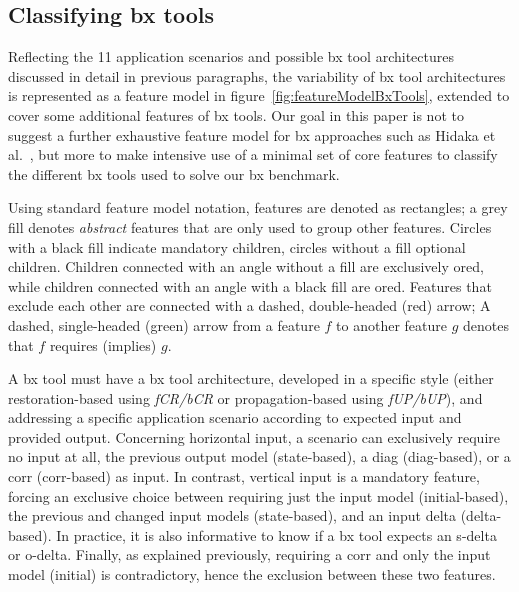 \subsection{Classifying bx tools}
\label{sec:classifying-bx-tools}
Reflecting the 11 application scenarios and possible bx tool architectures discussed in detail in previous paragraphs, the variability of bx tool architectures is represented as a feature model in figure~\ref{fig:featureModelBxTools}, extended to cover some additional features of bx tools.
Our goal in this paper is not to suggest a further exhaustive feature model for bx approaches such as Hidaka et al.~\cite{SOSYM-Hidaka2016}, but more to make intensive use of a minimal set of core features to classify the different bx tools used to solve our bx benchmark.

Using standard feature model notation, features are denoted as rectangles; a grey fill denotes \emph{abstract} features that are only used to group other features.
Circles with a black fill indicate mandatory children, circles without a fill optional children.
Children connected with an angle without a fill are exclusively ored, while children connected with an angle with a black fill are ored.
Features that exclude each other are connected with a dashed, double-headed (red) arrow; 
A dashed, single-headed (green) arrow from a feature $f$ to another feature $g$ denotes that $f$ requires (implies) $g$.   


A bx tool must have a bx tool architecture, developed in a specific style (either restoration-based using \emph{fCR/bCR} or propagation-based using \emph{fUP/bUP}), and addressing a specific application scenario according to expected input and provided output.
%
Concerning horizontal input, a scenario can exclusively require no input at all, the previous output model (state-based), a diag (diag-based), or a corr (corr-based) as input.
%
In contrast, vertical input is a mandatory feature, forcing an exclusive choice between requiring just the input model (initial-based), the previous and changed input models (state-based), and an input delta  (delta-based).
In practice, it is also informative to know if a bx tool expects an s-delta or o-delta.
Finally, as explained previously, requiring a corr and only the input model (initial) is contradictory, hence the exclusion between these two features.

